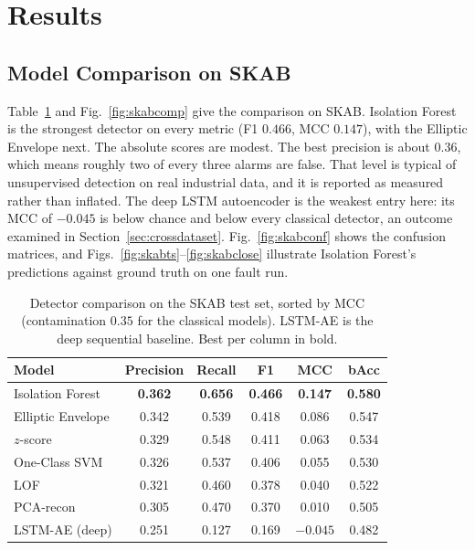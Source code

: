 \documentclass[runningheads]{llncs}
\begin{document}
\section{Results}
\label{sec:results}

\subsection{Model Comparison on SKAB}
Table~\ref{tab:skab} and Fig.~\ref{fig:skabcomp} give the comparison on SKAB.
Isolation Forest is the strongest detector on every metric (F1 $0.466$,
MCC $0.147$), with the Elliptic Envelope next. The absolute scores are modest.
The best precision is about $0.36$, which means roughly two of every three alarms
are false. That level is typical of unsupervised detection on real industrial
data, and it is reported as measured rather than inflated. The deep LSTM
autoencoder is the weakest entry here: its MCC of $-0.045$ is below chance and
below every classical detector, an outcome examined in
Section~\ref{sec:crossdataset}. Fig.~\ref{fig:skabconf} shows the confusion
matrices, and Figs.~\ref{fig:skabts}--\ref{fig:skabclose} illustrate Isolation
Forest's predictions against ground truth on one fault run.

\begin{table}[htbp]
\centering
\caption{Detector comparison on the SKAB test set, sorted by MCC (contamination
$0.35$ for the classical models). LSTM-AE is the deep sequential baseline. Best
per column in bold.}
\label{tab:skab}
\begin{tabular}{lccccc}
\toprule
Model & Precision & Recall & F1 & MCC & bAcc \\
\midrule
Isolation Forest   & \textbf{0.362} & \textbf{0.656} & \textbf{0.466} & \textbf{0.147} & \textbf{0.580} \\
Elliptic Envelope  & 0.342 & 0.539 & 0.418 & 0.086 & 0.547 \\
$z$-score          & 0.329 & 0.548 & 0.411 & 0.063 & 0.534 \\
One-Class SVM      & 0.326 & 0.537 & 0.406 & 0.055 & 0.530 \\
LOF                & 0.321 & 0.460 & 0.378 & 0.040 & 0.522 \\
PCA-recon          & 0.305 & 0.470 & 0.370 & 0.010 & 0.505 \\
LSTM-AE (deep)     & 0.251 & 0.127 & 0.169 & $-0.045$ & 0.482 \\
\bottomrule
\end{tabular}
\end{table}
\end{document}
